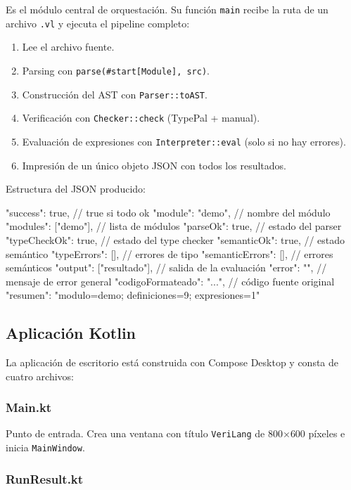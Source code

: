 \documentclass[12pt]{article}
\newcommand{\code}[1]{\texttt{#1}}
\begin{document}
Es el módulo central de orquestación. Su función \code{main} recibe la
ruta de un archivo \code{.vl} y ejecuta el pipeline completo:

\begin{enumerate}
  \item Lee el archivo fuente.
  \item Parsing con \code{parse(\#start[Module], src)}.
  \item Construcción del AST con \code{Parser::toAST}.
  \item Verificación con \code{Checker::check} (TypePal + manual).
  \item Evaluación de expresiones con \code{Interpreter::eval} (solo si
        no hay errores).
  \item Impresión de un único objeto JSON con todos los resultados.
\end{enumerate}

Estructura del JSON producido:

\begin{rascal}
{
  "success": true,            // true si todo ok
  "module": "demo",           // nombre del módulo
  "modules": ["demo"],        // lista de módulos
  "parseOk": true,            // estado del parser
  "typeCheckOk": true,        // estado del type checker
  "semanticOk": true,         // estado semántico
  "typeErrors": [],           // errores de tipo
  "semanticErrors": [],       // errores semánticos
  "output": ["resultado"],    // salida de la evaluación
  "error": "",                // mensaje de error general
  "codigoFormateado": "...",  // código fuente original
  "resumen": "modulo=demo; definiciones=9; expresiones=1"
}
\end{rascal}

\subsection{Aplicación Kotlin}

La aplicación de escritorio está construida con Compose Desktop y consta
de cuatro archivos:

\subsubsection*{Main.kt}

Punto de entrada. Crea una ventana con título \texttt{VeriLang} de
800$\times$600 píxeles e inicia \code{MainWindow}.

\subsubsection*{RunResult.kt}
\end{document}
